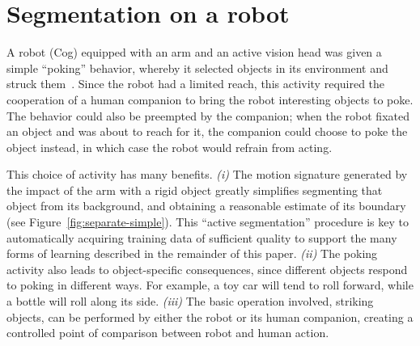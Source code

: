 
\section{Segmentation on a robot}

\label{sect:poking}

A robot (Cog) equipped with an arm and an active vision head was given a
simple ``poking'' behavior, whereby it selected objects in its
environment and struck them~\citep{fitzpatrick02towards}.
Since the robot had a limited reach,
this activity required the cooperation of a human
companion to bring the robot interesting objects to poke.
The behavior could also be preempted by the companion; when the robot
fixated an object and was about to reach for it, the companion
could choose to poke the object instead, in which case the robot
would refrain from acting.

This choice of activity has many benefits.  
%
{\em (i)}
The motion signature
generated by the impact of the arm with a rigid object greatly
simplifies segmenting that object from its background, and obtaining a
reasonable estimate of its boundary (see
Figure~\ref{fig:separate-simple}).  
This ``active segmentation''
procedure is key to automatically acquiring training data of
sufficient quality to support the many forms of learning described in
the remainder of this paper.
%
{\em (ii)}
The poking activity also leads to object-specific consequences, since
different objects respond to poking in different ways.  For example,
a toy car will tend to roll forward, while a bottle will roll along its
side.
%
{\em (iii)}
The basic operation involved, striking objects, can be performed
by either the robot or its human companion, creating a
controlled point of 
comparison between robot and human action.


%



